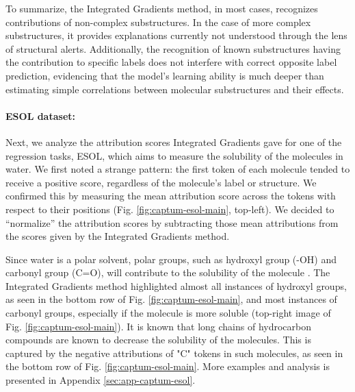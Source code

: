 \documentclass{article} %
\begin{document}
To summarize, the Integrated Gradients method, in most cases, recognizes %
contributions of non-complex substructures. In the case of more complex substructures, it provides explanations currently not understood through the lens of structural alerts. Additionally, the recognition of known substructures having the contribution to specific labels does not interfere with correct opposite label prediction, evidencing that the model's learning ability is much deeper than estimating simple correlations between molecular substructures and their effects.

\paragraph{ESOL dataset:}
Next, we analyze the attribution scores Integrated Gradients gave for one of the regression tasks, ESOL, which aims to measure the solubility of the molecules in water. 
We first noted a strange pattern: the first token of each molecule tended to receive a positive score, regardless of the molecule's label or structure. We confirmed this by measuring the mean attribution score across the tokens with respect to their positions (Fig. \ref{fig:captum-esol-main}, top-left). We decided to ``normalize'' the attribution scores by subtracting those mean attributions from the scores given by the Integrated Gradients method.

Since water is a polar solvent, polar groups, such as hydroxyl group (-OH) and carbonyl group (C=O), will contribute to the solubility of the molecule \citep{book-review-organic-functional-groups}. The Integrated Gradients method highlighted almost all instances of hydroxyl groups, as seen in the bottom row of Fig. \ref{fig:captum-esol-main}, and most instances of carbonyl groups, especially if the molecule is more soluble (top-right image of Fig. \ref{fig:captum-esol-main}). It is known that long chains of hydrocarbon compounds are known to decrease the solubility of the molecules. This is captured by the negative attributions of "C" tokens in such molecules, as seen in the bottom row of Fig. \ref{fig:captum-esol-main}. 
More examples and analysis is presented in Appendix \ref{sec:app-captum-esol}. 
\end{document}
